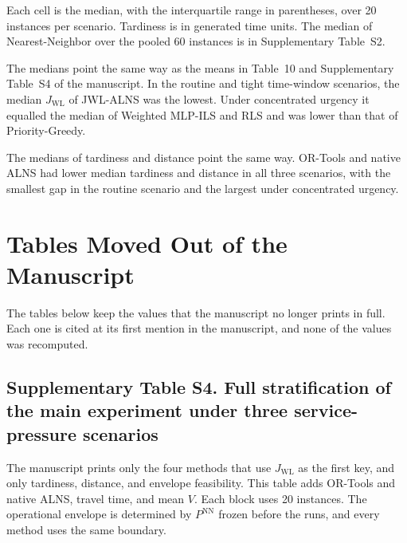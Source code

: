 \documentclass[11pt,a4paper]{article}
\begin{document}
Each cell is the median, with the interquartile range in parentheses, over 20 instances per scenario. Tardiness is in generated time units. The median of Nearest-Neighbor over the pooled 60 instances is in Supplementary Table~S2.

The medians point the same way as the means in Table~10 and Supplementary Table~S4 of the manuscript. In the routine and tight time-window scenarios, the median $J_{\mathrm{WL}}$ of JWL-ALNS was the lowest. Under concentrated urgency it equalled the median of Weighted MLP-ILS and RLS and was lower than that of Priority-Greedy.

The medians of tardiness and distance point the same way. OR-Tools and native ALNS had lower median tardiness and distance in all three scenarios, with the smallest gap in the routine scenario and the largest under concentrated urgency.

\section{Tables Moved Out of the Manuscript}

The tables below keep the values that the manuscript no longer prints in full. Each one is cited at its first mention in the manuscript, and none of the values was recomputed.

\subsection*{Supplementary Table S4. Full stratification of the main experiment under three service-pressure scenarios}

The manuscript prints only the four methods that use $J_{\mathrm{WL}}$ as the first key, and only tardiness, distance, and envelope feasibility. This table adds OR-Tools and native ALNS, travel time, and mean $V$. Each block uses 20 instances. The operational envelope is determined by $P^{\mathrm{NN}}$ frozen before the runs, and every method uses the same boundary.
\end{document}
